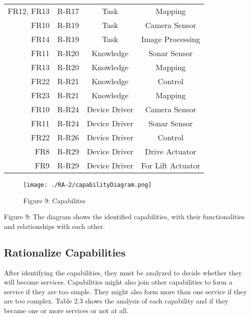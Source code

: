 {\begin{tabular}{| r | p{2cm} | c | c |}
	FR12, FR13 				& R-R17 & Task & Mapping\\
	FR10 					& R-R19 & Task & Camera Sensor\\
	FR14	 				& R-R19 & Task & Image Processing\\
	\hline
	FR11 					& R-R20 & Knowledge & Sonar Sensor\\
	FR13 					& R-R20 & Knowledge & Mapping\\ %
	FR22 					& R-R21 & Knowledge & Control\\
	FR23 					& R-R21 & Knowledge & Mapping\\
	\hline
	FR10 					& R-R24 & Device Driver & Camera Sensor\\
	FR11 					& R-R24 & Device Driver & Sonar Sensor\\
	FR22 					& R-R26 & Device Driver & Control\\
	FR8 					& R-R29 & Device Driver & Drive Actuator\\
	FR9 					& R-R29 & Device Driver & For Lift Actuator\\
	\hline
\end{tabular}
}


\begin{figure}[ht!]
 \centering
 \texttt{[image: ./RA-2/capabilityDiagram.png]}
 \caption{Figure 9: Capabilites}
 \label{fig:capabilities}
\end{figure}

Figure 9: The diagram shows the identified capabilities, with their functionalities and relationships with each other.

\subsection{Rationalize Capabilities}
After identifying the capabilities, they must be analyzed to decide whether they will become services. Capabilities might also join other capabilities to form a service if they are too simple. They might also form more than one service if they are too complex. Table 2.3 shows the analysis of each capability and if they became one or more services or not at all.

